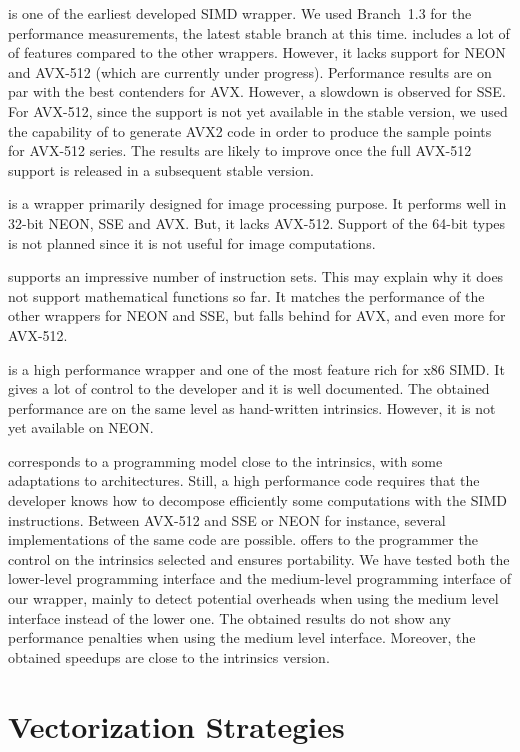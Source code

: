 \textbf{\Vc} is one of the earliest developed SIMD \Cxx wrapper. We used
Branch~1.3 for the performance measurements, the latest stable branch at this
time. \Vc includes a lot of of features compared to the other wrappers. However,
it lacks support for NEON and AVX-512 (which are currently under progress).
Performance results are on par with the best contenders for AVX. However, a
slowdown is observed for SSE. For AVX-512, since the support is not yet
available in the stable version, we used the capability of \Vc to generate AVX2
code in order to produce the sample points for AVX-512 series. The results are
likely to improve once the full AVX-512 support is released in a subsequent
stable version.

\textbf{\TSIMD} is a wrapper primarily designed for image processing purpose.
It performs well in 32-bit NEON, SSE and AVX. But, it lacks AVX-512. Support of
the 64-bit types is not planned since it is not useful for image computations.

\newpage
\textbf{\simdpp} supports an impressive number of instruction
sets. This may explain why it does not support mathematical functions so far. It
matches the performance of the other wrappers for NEON and SSE, but falls behind
for AVX, and even more for AVX-512.

\textbf{\VCL} is a high performance wrapper and one of the most feature rich
for x86 SIMD. It gives a lot of control to the developer and it is
well documented. The obtained performance are on the same level as hand-written
intrinsics. However, it is not yet available on NEON.

\textbf{\MIPP} corresponds to a programming model close to the intrinsics, with
some adaptations to architectures. Still, a high performance code requires that
the developer knows how to decompose efficiently some computations with the SIMD
instructions. Between AVX-512 and SSE or NEON for instance, several
implementations of the same code are possible. \MIPP offers to the programmer
the control on the intrinsics selected and ensures portability. We have tested
both the lower-level programming interface and the medium-level programming
interface of our \MIPP wrapper, mainly to detect potential overheads when using
the medium level interface instead of the lower one. The obtained results do not
show any performance penalties when using the \MIPP medium level interface.
Moreover, the obtained speedups are close to the intrinsics version.


\section{Vectorization Strategies}
\label{sec:opt_vec}

